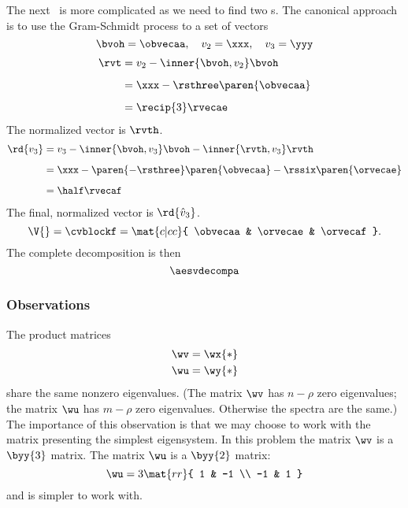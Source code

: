 The next \ns \ is more complicated as we need to find two \vvv s. The canonical approach is to use the Gram-Schmidt process to a set of vectors
\begin{equation}
  \bvoh = \obvecaa, \quad v_{2} = \xxx, \quad v_{3} = \yyy
\end{equation}
%
\begin{equation}
  \begin{split}
    \rvt 
      &= v_{2} - \inner{\bvoh,v_{2}} \bvoh \\[5pt]
      &= \xxx - \rsthree \paren{\obvecaa}  \\[5pt]
      &= \recip{3} \rvecae
  \end{split}
\end{equation}
The normalized vector is $\rvth$.
%
\begin{equation}
  \begin{split}
    {\rd{ v_{3} }} 
      &= v_{3} - \inner{\bvoh,v_{3}} \bvoh - \inner{\rvth,v_{3}} \rvth \\[5pt]
      &= \xxx  - \paren{-\rsthree}  \paren{\obvecaa} - \rssix \paren{\orvecae}   \\[5pt]
      &= \half \rvecaf
  \end{split}
\end{equation}
The final, normalized vector is ${\rd{ \hat{v}_{3} }}$.
\begin{equation}
  \V{}= \cvblockf = \mat{c|cc}{ \obvecaa & \orvecae & \orvecaf}.
\end{equation}
The complete decomposition is then
\begin{equation}
  \aesvdecompa
  \label{eq:svd:a}
\end{equation}

\subsubsection{Observations}
The product matrices
\begin{equation}
  \begin{split}
    \wv &= \wx{*} \\
    \wu &= \wy{*}
  \end{split}
\end{equation}
share the same nonzero eigenvalues. (The matrix $\wv$ has $n-\rho$ zero eigenvalues; the matrix $\wu$ has $m-\rho$ zero eigenvalues. Otherwise the spectra are the same.) The importance of this observation is that we may choose to work with the matrix presenting the simplest eigensystem. In this problem the matrix $\wv$ is a $\byy{3}$ matrix. The matrix $\wu$ is a $\byy{2}$ matrix:
\begin{equation}
  \wu = 3 \mat{rr}{ 1 & -1 \\ -1 & 1 }
\end{equation}
and is simpler to work with.

\endinput